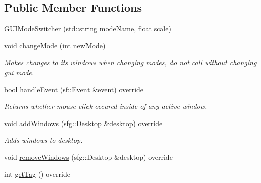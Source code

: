 \subsection*{Public Member Functions}
\begin{DoxyCompactItemize}
\item 
\hyperlink{classGUIModeSwitcher_aac580eabe162e7f8a8ba88ad3b2e3ebc}{G\-U\-I\-Mode\-Switcher} (std\-::string mode\-Name, float scale)
\item 
\hypertarget{classGUIModeSwitcher_a107432263afafda110ede5a399c5db11}{void \hyperlink{classGUIModeSwitcher_a107432263afafda110ede5a399c5db11}{change\-Mode} (int new\-Mode)}\label{classGUIModeSwitcher_a107432263afafda110ede5a399c5db11}

\begin{DoxyCompactList}\small\item\em Makes changes to its windows when changing modes, do not call without changing gui mode. \end{DoxyCompactList}\item 
\hypertarget{classGUIModeSwitcher_aeb0fb8ccf08088ddb6a32fbfc20459e5}{bool \hyperlink{classGUIModeSwitcher_aeb0fb8ccf08088ddb6a32fbfc20459e5}{handle\-Event} (sf\-::\-Event \&event) override}\label{classGUIModeSwitcher_aeb0fb8ccf08088ddb6a32fbfc20459e5}

\begin{DoxyCompactList}\small\item\em Returns whether mouse click occured inside of any active window. \end{DoxyCompactList}\item 
\hypertarget{classGUIModeSwitcher_ab0bf3051862cf606baf6ac0f45f4aa0d}{void \hyperlink{classGUIModeSwitcher_ab0bf3051862cf606baf6ac0f45f4aa0d}{add\-Windows} (sfg\-::\-Desktop \&desktop) override}\label{classGUIModeSwitcher_ab0bf3051862cf606baf6ac0f45f4aa0d}

\begin{DoxyCompactList}\small\item\em Adds windows to desktop. \end{DoxyCompactList}\item 
void \hyperlink{classGUIModeSwitcher_a68909a312720fa4eaaa4fa99ce0e5d64}{remove\-Windows} (sfg\-::\-Desktop \&desktop) override
\item 
\hypertarget{classGUIModeSwitcher_a23caeac2d6450aeb7e4d4c418394cf01}{int \hyperlink{classGUIModeSwitcher_a23caeac2d6450aeb7e4d4c418394cf01}{get\-Tag} () override}\label{classGUIModeSwitcher_a23caeac2d6450aeb7e4d4c418394cf01}


\end{DoxyCompactItemize}

